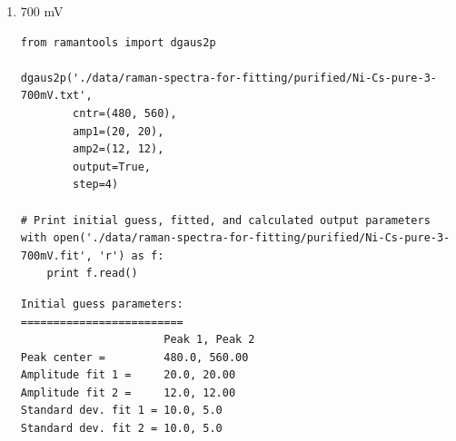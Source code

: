 \documentclass[journal=jpccck,manuscript=suppinfo,email=true]{achemso}
\begin{document}
\begin{enumerate}
\begin{enumerate}
\begin{enumerate}
\begin{verbatim}
dgaus2p('./data/raman-spectra-for-fitting/purified/Ni-Cs-pure-3-600mV.txt',
        cntr=(480, 560),
        amp1=(15, 15),
        amp2=(8, 8),
        output=True,
        step=4)

# Print initial guess, fitted, and calculated output parameters
with open('./data/raman-spectra-for-fitting/purified/Ni-Cs-pure-3-600mV.fit', 'r') as f:
    print f.read()
\end{verbatim}

\begin{verbatim}
Initial guess parameters:
=========================
                      Peak 1, Peak 2
Peak center =         480.0, 560.00
Amplitude fit 1 =     15.0, 15.00
Amplitude fit 2 =     8.0, 8.00
Standard dev. fit 1 = 10.0, 5.0
Standard dev. fit 2 = 10.0, 5.0

Baseline parameters:
=========================
Slope =               -0.01
Intercept =           9.67

Fitted parameters:
=========================
                      Peak 1, Peak 2
Peak center =         478.33, 557.10
Amplitude fit 1 =     11.07, 14.10
Amplitude fit 2 =     5.99, 8.29
Standard dev. fit 1 = 15.73, 5.91
Standard dev. fit 2 = 31.73, 6.48

Calculation output:
========================
Mean peak 1 =         478.3 $\pm$ 0.21
Mean peak 2 =         557.1 $\pm$ 0.44
Height peak 1 =       30.9 $\pm$ 0.44
Height peak 2 =       19.4 $\pm$ 0.37
Area peak 1 =         912.3
Area peak 2 =         863.9
\end{verbatim}

\item 700 mV
\label{sec-4-1-0-2-3-2}
\begin{verbatim}
from ramantools import dgaus2p

dgaus2p('./data/raman-spectra-for-fitting/purified/Ni-Cs-pure-3-700mV.txt',
        cntr=(480, 560),
        amp1=(20, 20),
        amp2=(12, 12),
        output=True,
        step=4)

# Print initial guess, fitted, and calculated output parameters
with open('./data/raman-spectra-for-fitting/purified/Ni-Cs-pure-3-700mV.fit', 'r') as f:
    print f.read()
\end{verbatim}

\begin{verbatim}
Initial guess parameters:
=========================
                      Peak 1, Peak 2
Peak center =         480.0, 560.00
Amplitude fit 1 =     20.0, 20.00
Amplitude fit 2 =     12.0, 12.00
Standard dev. fit 1 = 10.0, 5.0
Standard dev. fit 2 = 10.0, 5.0


\end{verbatim}
\end{enumerate}
\end{enumerate}
\end{enumerate}
\end{document}
